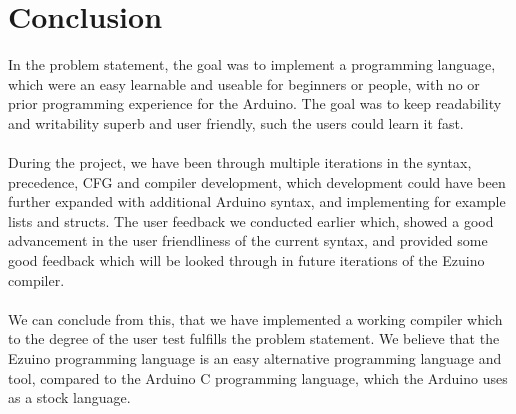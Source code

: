 \chapter{Conclusion}\label{ch:conclusion}
In the problem statement, the goal was to implement a programming language, which were an easy learnable and useable for beginners or people, with no or prior programming experience for the Arduino. The goal was to keep readability and writability superb and user friendly, such the users could learn it fast.\\
\\
During the project, we have been through multiple iterations in the syntax, precedence, CFG and compiler development, which development could have been further expanded with additional Arduino syntax, and implementing for example lists and structs. The user feedback we conducted earlier which, showed a good advancement in the user friendliness of the current syntax, and provided some good feedback which will be looked through in future iterations of the Ezuino compiler.\\
\\
We can conclude from this, that we have implemented a working compiler which to the degree of the user test fulfills the problem statement. We believe that the Ezuino programming language is an easy alternative programming language and tool, compared to the Arduino C programming language, which the Arduino uses as a stock language.